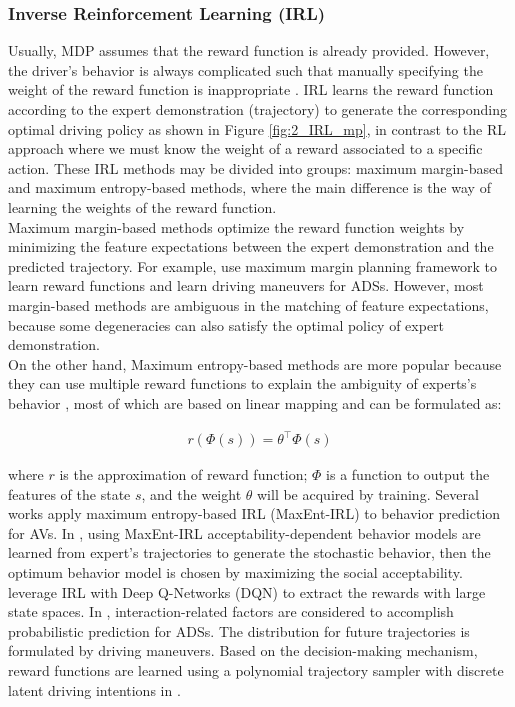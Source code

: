 \subsubsection{Inverse Reinforcement Learning (IRL)}
\label{subsubsec:2_irl_mp}

Usually, MDP assumes that the reward function is already provided. However, the driver’s behavior is always complicated such that manually specifying the weight of the reward function is inappropriate \cite{guan2018markov}. IRL learns the reward function according to the expert demonstration (trajectory) to generate the corresponding optimal driving policy as shown in Figure \ref{fig:2_IRL_mp}, in contrast to the RL approach where we must know the weight of a reward associated to a specific action. These IRL methods may be divided into groups: maximum margin-based and maximum entropy-based methods, where the main difference is the way of learning the weights of the reward function. \\
 
Maximum margin-based methods optimize the reward function weights by minimizing the feature expectations between the expert demonstration and the predicted trajectory. For example, \cite{silver2013learning} use maximum margin planning framework to learn reward functions and learn driving maneuvers for \acp{ADS}. However, most margin-based methods are ambiguous in the matching of feature expectations, because some degeneracies can also satisfy the optimal policy of expert demonstration. \\

On the other hand, Maximum entropy-based methods are more popular because they can use multiple reward functions to explain the ambiguity of experts's behavior \cite{aghasadeghi2011maximum}, most of which are based on linear mapping and can be formulated as:

\begin{equation}
\begin{aligned}
r(\Phi(s))=\theta^{\top} \Phi(s)
\end{aligned}
\end{equation}

where $r$ is the approximation of reward function; $\Phi$ is a function to output the features of the state $s$, and the weight $\theta$ will be acquired by training. Several works apply maximum entropy-based IRL (MaxEnt-IRL) to behavior prediction for AVs. In \cite{herman2015inverse}, using MaxEnt-IRL acceptability-dependent behavior models are learned from expert's trajectories to generate the stochastic behavior, then the optimum behavior model is chosen by maximizing the social acceptability. \cite{sharifzadeh2016learning} leverage IRL with Deep Q-Networks (DQN) to extract the rewards with large state spaces. In \cite{sun2018probabilistic}, interaction-related factors are considered to accomplish probabilistic prediction for \acp{ADS}. The distribution for future trajectories is formulated by driving maneuvers. Based on the decision-making mechanism, reward functions are learned using a polynomial trajectory sampler with discrete latent driving intentions in \cite{huang2021driving}.

